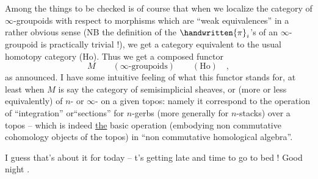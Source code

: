 Among the things to be checked is of course that when we localize the category of \deleted{\unsure{(}}$\infty$-groupoids with respect to morphisms which are ``weak equivalences'' in a rather obvious sense (NB the definition of the $\handwritten{\pi}_i$'s of an $\infty$-groupoid is practically trivial !), we get a category equivalent to the usual homotopy category (Ho). Thus we get a composed functor
\[
M\qquad (\infty\text{-groupoids})\qquad(\mathrm{Ho})\quad ,
\]
as announced. I have some intuitive feeling of what this functor stands for, at least when $M$ is say the category of semisimplicial sheaves, or (more or less equivalently) of $n$- or $\infty$- on a given topos: namely it  correspond to the operation of ``integration'' or``sections'' for $n$-gerbs (more generally for $n$-stacks) over a topos -- which is indeed \uline{the} basic operation (embodying non commutative cohomology objects of the topos) in ``non commutative homological algebra''.

I guess that's about it for today -- t's getting late and time to go to bed ! Good night .

